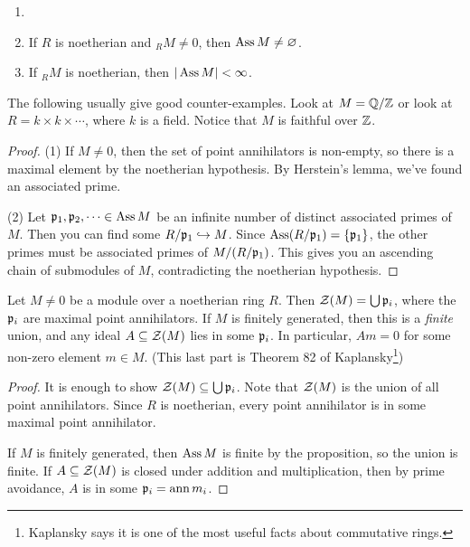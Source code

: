  \setcounter{lecture}{10}


 \begin{proposition}
   \begin{enumerate}
     \item[]
     \item If $R$ is noetherian and ${}_R M\neq 0$, then $\operatorname{Ass} M \neq \varnothing$.
     \item If ${}_R M$ is noetherian, then $|\operatorname{Ass} M| < \infty$.
   \end{enumerate}
 \end{proposition}
 \begin{example}
   The following usually give good counter-examples. Look at $M=\mathbb{Q}/\mathbb{Z}$ or look at
   $R=k\times k\times \cdots$, where $k$ is a field. Notice that $M$ is faithful over
   $\mathbb{Z}$.
 \end{example}
 \begin{proof}
   (1) If $M\neq 0$, then the set of point annihilators is non-empty, so there is a maximal
   element by the noetherian hypothesis. By Herstein's lemma, we've found an associated
   prime.

   (2) Let $\mathfrak{p}_1,\mathfrak{p}_2,\cdots \in \operatorname{Ass} M$ be an infinite number of distinct associated
   primes of $M$. Then you can find some $R/\mathfrak{p}_1\hookrightarrow M$. Since $\operatorname{Ass}
   (R/\mathfrak{p}_1)=\{\mathfrak{p}_1\}$, the other primes must be associated primes of $M/(R/\mathfrak{p}_1)$. This
   gives you an ascending chain of submodules of $M$, contradicting the noetherian
   hypothesis.
 \end{proof}
 \begin{theorem}[6.2]
   Let $M\neq 0$ be a module over a noetherian ring $R$. Then $\mathcal{Z}(M)=\bigcup \mathfrak{p}_i$, where
   the $\mathfrak{p}_i$ are maximal point annihilators. If $M$ is finitely generated, then this is
   a \emph{finite} union, and any ideal $A\subseteq \mathcal{Z}(M)$ lies in some $\mathfrak{p}_i$. In
   particular, $Am=0$ for some non-zero element $m\in M$. (This last part is Theorem 82
   of Kaplansky\footnote{Kaplansky says it is one of the most useful facts about
   commutative rings.})
 \end{theorem}
 \begin{proof}
   It is enough to show $\mathcal{Z}(M)\subseteq \bigcup \mathfrak{p}_i$. Note that $\mathcal{Z}(M)$ is the union of
   all point annihilators. Since $R$ is noetherian, every point annihilator is in some
   maximal point annihilator.

   If $M$ is finitely generated, then $\operatorname{Ass} M$ is finite by the proposition, so the union
   is finite. If $A\subseteq \mathcal{Z}(M)$ is closed under addition and multiplication, then by
   prime avoidance, $A$ is in some $\mathfrak{p}_i=\operatorname{ann} m_i$.
 \end{proof}
